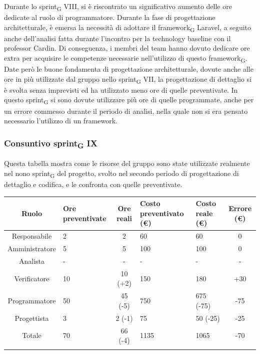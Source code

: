 Durante lo sprint\textsubscript{G} VIII, si è riscontrato un significativo aumento delle ore dedicate al ruolo di programmatore. 
Durante la fase di progettazione architetturale, è emersa la necessità di adottare il framework\textsubscript{G} Laravel, a seguito anche dell'analisi fatta durante l'incontro per la technology baseline con il professor Cardin. Di conseguenza, i membri del team hanno dovuto dedicare ore extra per acquisire le competenze necessarie nell'utilizzo di questo framework\textsubscript{G}.
Date però le buone fondamenta di progettazione architetturale, dovute anche alle ore in più utilizzate dal gruppo nello sprint\textsubscript{G} VII, la progettazione di dettaglio si è svolta senza imprevisti ed ha utilizzato meno ore di quelle preventivate.
In questo sprint\textsubscript{G} si sono dovute utilizzare più ore di quelle programmate, anche per un errore commesso durante il periodo di analisi, nella quale non si era pensato necessario l'utilizzo di un framework.

\newpage
\subsubsection{Consuntivo sprint\textsubscript{G} IX}

Questa tabella mostra come le risorse del gruppo sono state utilizzate realmente nel nono sprint\textsubscript{G} del progetto, svolto nel secondo periodo di progettazione di dettaglio e codifica, e le confronta con quelle preventivate.

\setlength\extrarowheight{5pt}
\begin{tabularx}{\textwidth}{|c|XcXX|c|}
	\hline
	\rowcolor{white}
	\textbf{Ruolo} & \textbf{Ore preventivate} & \textbf{Ore reali} & \textbf{Costo preventivato (€)} & \textbf{Costo reale (€)} & \textbf{Errore (€)} \\
	\hline
	Responsabile & 2 & 2 & 60 & 60 & 0 \\
	Amministratore & 5 & 5 & 100 & 100 & 0 \\
	Analista & - & - & - & - & - \\
	Verificatore & 10 & 10 (+2) & 150 & 180 & +30 \\
	Programmatore & 50 & 45 (-5) & 750 & 675 (-75) & -75 \\
	Progettista & 3 & 2 (-1) & 75 & 50 (-25) & -25 \\
	\hline
	Totale & 70 & 66 (-4) & 1135 & 1065 & -70 \\
	\hline
	\rowcolor{white}
	\caption{Consuntivo ore e costi per ruolo del nono sprint\textsubscript{G}}
\end{tabularx}
